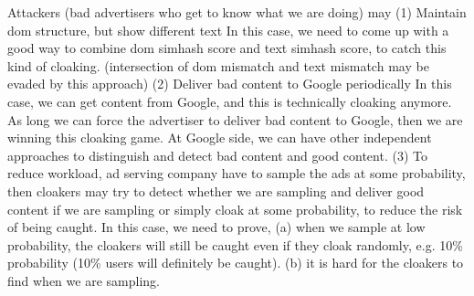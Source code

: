 Attackers (bad advertisers who get to know what we are doing) may
(1) Maintain dom structure, but show different text
In this case, we need to come up with a good way to combine dom simhash score
and text simhash score, to catch this kind of cloaking. (intersection of dom
mismatch and text mismatch may be evaded by this approach)
(2) Deliver bad content to Google periodically
In this case, we can get content from Google, and this is technically cloaking
anymore. As long we can force the advertiser to deliver bad content to Google,
then we are winning this cloaking game. At Google side, we can have other
independent approaches to distinguish and detect bad content and good content.
(3) To reduce workload, ad serving company have to sample the ads at some
probability, then cloakers may try to detect whether we are sampling and deliver
good content if we are sampling or simply cloak at some probability, to reduce
the risk of being caught.
In this case, we need to prove, (a) when we sample at low probability, the
cloakers will still be caught even if they cloak randomly, e.g. 10\% probability
(10\% users will definitely be caught). (b) it is hard for the cloakers to find
when we are sampling.



